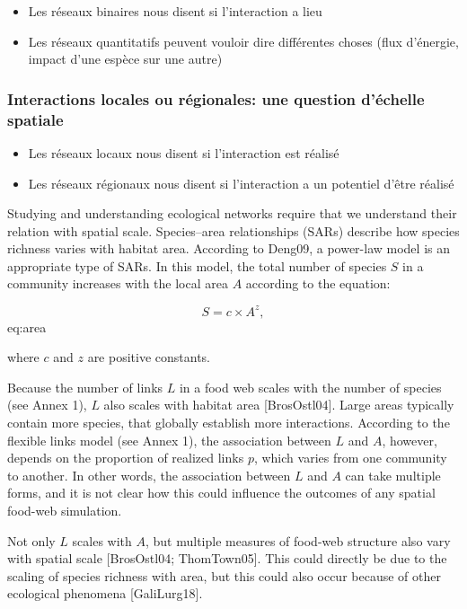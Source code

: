 \begin{itemize}
    \item Les réseaux binaires nous disent si l'interaction a lieu
    \item Les réseaux quantitatifs peuvent vouloir dire différentes choses (flux d'énergie, impact d'une espèce sur une autre)
\end{itemize}

\subsubsection{Interactions locales ou régionales: une question d'échelle spatiale} 

\begin{itemize}
    \item Les réseaux locaux nous disent si l'interaction est réalisé 
    \item Les réseaux régionaux nous disent si l'interaction a un potentiel d'être réalisé
\end{itemize}

Studying and understanding
ecological networks require that we understand their relation with spatial
scale.  Species–area relationships (SARs) describe how species richness varies
with habitat area. According to Deng09, a power-law model is an appropriate
type of SARs. In this model, the total number of species $S$ in a community
increases with the local area $A$ according to the equation:

$$ S = c \times A^z, $$ {eq:area}



where $c$ and $z$ are positive constants.

Because the number of links $L$ in a food web scales with the number of species
(see Annex 1), $L$ also scales with habitat area [BrosOstl04]. Large areas
typically contain more species, that globally establish more interactions.
According to the flexible links model (see Annex 1), the association between $L$
and $A$, however, depends on the proportion of realized links $p$, which varies
from one community to another. In other words, the association between $L$ and
$A$ can take multiple forms, and it is not clear how this could influence the
outcomes of any spatial food-web simulation.

Not only $L$ scales with $A$, but multiple measures of food-web structure also
vary with spatial scale [BrosOstl04; ThomTown05]. This could directly be due
to the scaling of species richness with area, but this could also occur because
of other ecological phenomena [GaliLurg18].

